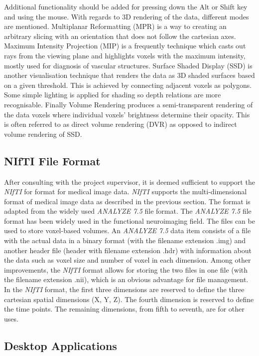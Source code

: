 \documentclass[a4paper,11pt,titlepage]{article}
\begin{document}
 Additional functionality should be added for pressing down the Alt or Shift key and using the mouse.
With regards to 3D rendering of the data, different modes are mentioned. Multiplanar Reformatting (MPR) is a way to creating an arbitrary slicing with an orientation that does not follow the cartesian axes. Maximum Intensity Projection (MIP) is a frequently technique which casts out rays from the viewing plane and highlights voxels with the maximum intensity, mostly used for diagnosis of vascular structures. Surface Shaded Display (SSD) is another visualisation technique that renders the data as 3D shaded surfaces based on a  given threshold. This is achieved by connecting adjacent voxels as polygons. Some simple lighting is applied for shading so depth relations are more recognisable. Finally Volume Rendering produces a semi-transparent rendering of the data voxels where individual voxels' brightness determine their opacity. This is often referred to as direct volume rendering (DVR) as opposed to indirect volume rendering of SSD.

\subsection{NIfTI File Format}

After consulting with the project supervisor, it is deemed sufficient to support the \textit{NIfTI} for format for medical image data. \textit{NIfTI} supports the multi-dimensional format of medical image data as described in the previous section. The format is adapted from the widely used \textit{ANALYZE 7.5} file format. The \textit{ANALYZE 7.5} file format has been widely used in the functional neuroimaging field. The files can be used to store voxel-based volumes. An \textit{ANALYZE 7.5} data item consists of a file with the actual data in a binary format (with the filename extension .img) and another header file (header with filename extension .hdr) with information about the data such as voxel size and number of voxel in each dimension. Among other improvements, the \textit{NIfTI} format allows for storing the two files in one file (with the filename extension .nii), which is an obvious advantage for file management.
In the \textit{NIfTI} format, the first three dimensions are reserved to define the three cartesian spatial dimensions (X, Y, Z). The fourth dimension is reserved to define the time points. The remaining dimensions, from fifth to seventh, are for other uses. 

\subsection{Desktop Applications}
\end{document}

